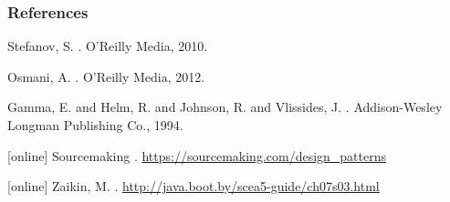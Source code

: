 \documentclass{beamer}
\begin{document}
\begin{frame}
  \frametitle{References}    
  \begin{thebibliography}{6}    
  
  \beamertemplatebookbibitems
   Stefanov, S.
    .
    \newblock O'Reilly Media, 2010.
  
  \beamertemplatebookbibitems
   Osmani, A.
    .
    \newblock O'Reilly Media, 2012.
    
  \beamertemplatebookbibitems
  Gamma, E. and Helm, R. and Johnson, R. and Vlissides, J.
    .
    \newblock Addison-Wesley Longman Publishing Co., 1994.
  
  [online]
   Sourcemaking
  .
  \newblock \url{https://sourcemaking.com/design_patterns}
  
  [online]
   Zaikin, M. 
  .
  \newblock \url{http://java.boot.by/scea5-guide/ch07s03.html}
 
  \end{thebibliography}
\end{frame}
\end{document}
